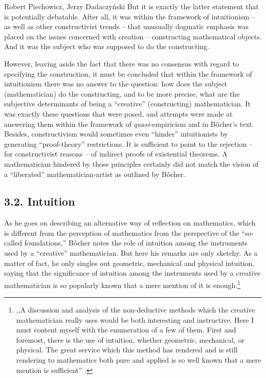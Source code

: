\begin{artengenv}{Robert Piechowicz, Jerzy Dadaczyński}
But it is exactly the latter statement that is potentially debatable. After all, it was within the framework of intuitionism -- as well as other constructivist trends -- that unusually dogmatic emphasis was placed on the issues concerned with creation -- constructing mathematical objects. And it was the subject who was supposed to do the constructing.

However, leaving aside the fact that there was no consensus with regard to specifying the construction, it must be concluded that within the framework of intuitionism there was no answer to the question: how does the subject (mathematician) do the constructing, and to be more precise, what are the subjective determinants of being a ``creative'' (constructing) mathematician. It was exactly these questions that were posed, and attempts were made at answering them within the framework of \textit{quasi}-empiricism and in Bôcher's text. Besides, constructivism would sometimes even ``hinder'' intuitionists by generating ``proof-theory'' restrictions. It is sufficient to point to the rejection -- for constructivist reasons -- of indirect proofs of existential theorems. A mathematician hindered by those principles certainly did not match the vision of a ``liberated'' mathematician-artist as outlined by Bôcher.

\subsection{3.2. Intuition}

As he goes on describing an alternative way of reflection on mathematics, which is different from the perception of mathematics from the perspective of the ``so-called foundations,'' Bôcher notes the role of intuition among the instruments used by a ``creative'' mathematician. But here his remarks are only sketchy. As a matter of fact, he only singles out geometric, mechanical and physical intuition, saying that the significance of intuition among the instruments used by a creative mathematician is so popularly known that a mere mention of it is enough.\footnote{,,A discussion and analysis of the non-deductive methods which the creative mathematician really uses would be both interesting and instructive. Here I must content myself with the enumeration of a few of them. First and foremost, there is the use of intuition, whether geometric, mechanical, or physical. The great service which this method has rendered and is still rendering to mathematics both pure and applied is so well known that a mere mention is sufficient''
\parencite[][p.134]{bocher_fundamental_1904}.%
}


\end{artengenv}
